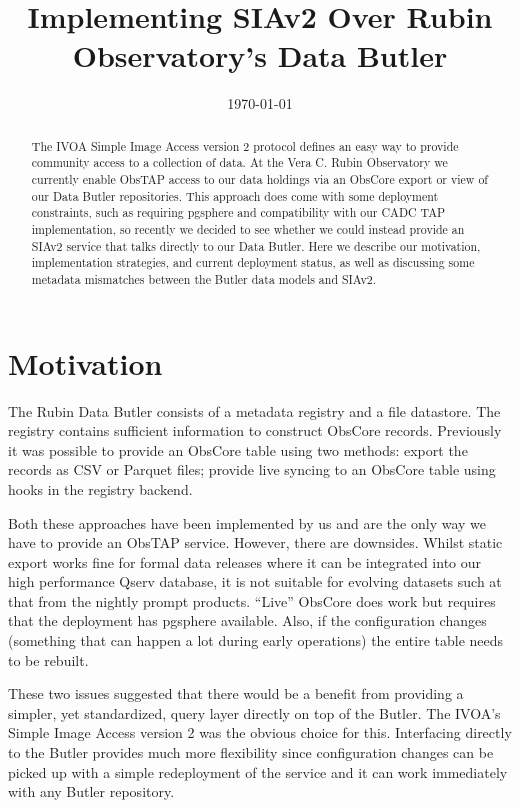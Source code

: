 \documentclass[11pt,twoside]{article}
\begin{document}

\date{\today}
\title{Implementing SIAv2 Over Rubin Observatory's Data Butler}



\begin{abstract}
The IVOA Simple Image Access version 2 protocol defines an easy way to provide community access to a collection of data. At the Vera C. Rubin Observatory we currently enable ObsTAP access to our data holdings via an ObsCore export or view of our Data Butler repositories. This approach does come with some deployment constraints, such as requiring pgsphere and compatibility with our CADC TAP implementation, so recently we decided to see whether we could instead provide an SIAv2 service that talks directly to our Data Butler. Here we describe our motivation, implementation strategies, and current deployment status, as well as discussing some metadata mismatches between the Butler data models and SIAv2.
\end{abstract}

\section{Motivation}

The Rubin Data Butler \citep{2022SPIE12189E..11J} consists of a metadata registry and a file datastore.
The registry contains sufficient information to construct ObsCore records.
Previously it was possible to provide an ObsCore table using two methods: export the records as CSV or Parquet files; provide live syncing to an ObsCore table using hooks in the registry backend.

Both these approaches have been implemented by us and are the only way we have to provide an ObsTAP service. However, there are downsides.
Whilst static export works fine for formal data releases where it can be integrated into our high performance Qserv database, it is not suitable for evolving datasets such at that from the nightly prompt products.
``Live'' ObsCore does work but requires that the deployment has pgsphere available. Also, if the configuration changes (something that can happen a lot during early operations) the entire table needs to be rebuilt.

These two issues suggested that there would be a benefit from providing a simpler, yet standardized, query layer directly on top of the Butler. The IVOA's Simple Image Access version 2 \citep[SIAv2;][]{2015ivoa.spec.1223D} was the obvious choice for this. Interfacing directly to the Butler provides much more flexibility since configuration changes can be picked up with a simple redeployment of the service and it can work immediately with any Butler repository.
\end{document}
